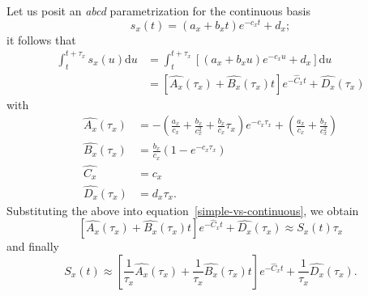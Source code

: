 \documentclass{article}
\begin{document}
Let us posit an \textit{abcd} parametrization for the continuous basis
\begin{equation}
s_x(t) = (a_x + b_x t)e^{-c_x t} + d_x;
\end{equation}
it follows that
\begin{equation}
\begin{split}
\int_t^{t+\tau_x} s_x(u) \mathrm{d}u &= \int_t^{t+\tau_x} \left[ (a_x + b_x u)e^{-c_x u} + d_x \right] \mathrm{d}u \\
                                     &= \left[\hat{A_x}(\tau_x) + \hat{B_x}(\tau_x) t\right] e^{-\hat{C}_x  t} + \hat{D_x}(\tau_x)
\end{split}
\end{equation}
with
\begin{equation}
\label{eq:integratedCoef}
\begin{split}
\hat{A_x}(\tau_x)&=-\left(\frac{a_x}{c_x}+ \frac{b_x}{c_x^{2}}+\frac{b_x}{c_x}\tau_x \right)e^{-c_x \tau_x}+\left(\frac{a_x}{c_x}+ \frac{b_x}{c_x^{2}}\right) \\
\hat{B_x}(\tau_x)&=\frac{b_x}{c_x}\left(1-e^{-c_x \tau_x}\right) \\
\hat{C_x}&=c_x \\
\hat{D_x}(\tau_x)&=d_x \tau_x.
\end{split}
\end{equation}
Substituting the above into equation~\ref{simple-vs-continuous}, we obtain
\begin{equation}
\left[\hat{A_x}(\tau_x) + \hat{B_x}(\tau_x) t\right] e^{-\hat{C}_x t} + \hat{D_x}(\tau_x) \approx S_x(t) \tau_x 
\end{equation}
and finally
\begin{equation}
S_x(t) \approx \left[\frac{1}{\tau_x}\hat{A_x}(\tau_x) + \frac{1}{\tau_x}\hat{B_x}(\tau_x) t\right] e^{-\hat{C}_x t} + \frac{1}{\tau_x}\hat{D_x}(\tau_x).
\end{equation}
\end{document}
